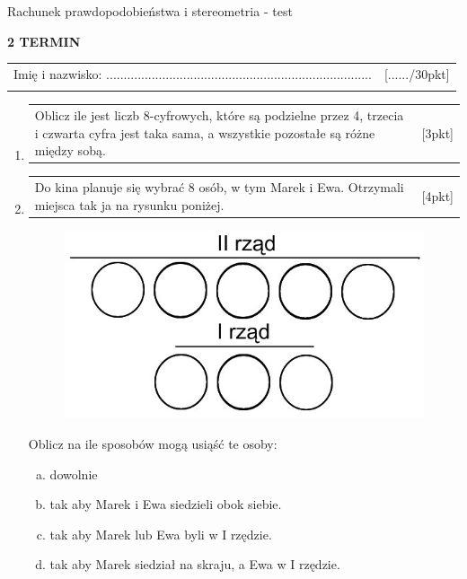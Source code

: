 \documentclass[12pt,a4paper]{article}
\begin{document}
	\begin{center}
		\LARGE Rachunek prawdopodobieństwa i stereometria - test
	\end{center}
	\vspace{1.5cm}
	\begin{flushright}
		\textbf{2 TERMIN}
	\end{flushright}
	\begin{tabular}{p{13cm} r}
		Imię i nazwisko: ............................................................................
		&[....../30pkt]\\ 
		\vspace{0.5cm}
	\end{tabular}
	\begin{enumerate}[1.]
		\item  \begin{tabular}{p{13cm} r}
			Oblicz ile jest liczb  8-cyfrowych, które są podzielne przez 4, trzecia i czwarta cyfra jest taka sama, a wszystkie pozostałe są różne między sobą.&[3pkt]\\ 
		\end{tabular}
	
		\item  \begin{tabular}{p{13cm} r}
			Do kina planuje się wybrać 8 osób, w tym Marek i Ewa. Otrzymali miejsca tak ja na rysunku poniżej.&[4pkt]\\ 
		\end{tabular}
	
		\begin{figure}[h]
			\centering
			\includegraphics[scale=0.4]{rpst1.jpeg}
		\end{figure}
	
		Oblicz na ile sposobów mogą usiąść te osoby:
		\begin{enumerate}[a)]
			\item dowolnie
			\item tak aby Marek i Ewa siedzieli obok siebie.
			\item tak aby Marek lub Ewa byli w I rzędzie.
			\item tak aby Marek siedział na skraju, a Ewa w I rzędzie.
		\end{enumerate}
	

\end{enumerate}
\end{document}

